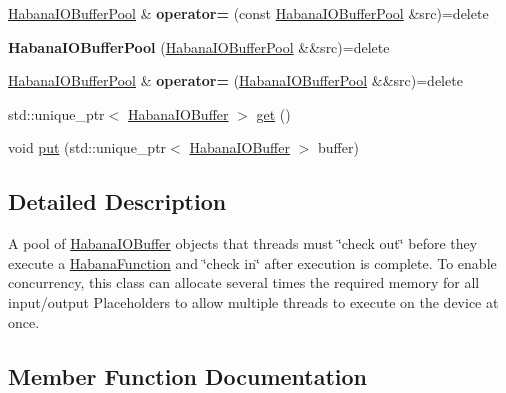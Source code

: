 \begin{DoxyCompactItemize}
\mbox{\label{classglow_1_1_habana_i_o_buffer_pool_aa74083f864afb58c58d45b2aabaea2f5}} 
\hyperlink{classglow_1_1_habana_i_o_buffer_pool}{Habana\+I\+O\+Buffer\+Pool} \& {\bfseries operator=} (const \hyperlink{classglow_1_1_habana_i_o_buffer_pool}{Habana\+I\+O\+Buffer\+Pool} \&src)=delete
\item 
\mbox{\label{classglow_1_1_habana_i_o_buffer_pool_a69283bc0b81a0c55fad0077141238d0c}} 
{\bfseries Habana\+I\+O\+Buffer\+Pool} (\hyperlink{classglow_1_1_habana_i_o_buffer_pool}{Habana\+I\+O\+Buffer\+Pool} \&\&src)=delete
\item 
\mbox{\label{classglow_1_1_habana_i_o_buffer_pool_a4100580e6be1b79f00fff599a9c66d90}} 
\hyperlink{classglow_1_1_habana_i_o_buffer_pool}{Habana\+I\+O\+Buffer\+Pool} \& {\bfseries operator=} (\hyperlink{classglow_1_1_habana_i_o_buffer_pool}{Habana\+I\+O\+Buffer\+Pool} \&\&src)=delete
\item 
std\+::unique\+\_\+ptr$<$ \hyperlink{classglow_1_1_habana_i_o_buffer}{Habana\+I\+O\+Buffer} $>$ \hyperlink{classglow_1_1_habana_i_o_buffer_pool_acd1ce8fdc668b037a9fcfe9cd11c91a2}{get} ()
\item 
void \hyperlink{classglow_1_1_habana_i_o_buffer_pool_a13398e7b08c52427ab3e9838a3d41697}{put} (std\+::unique\+\_\+ptr$<$ \hyperlink{classglow_1_1_habana_i_o_buffer}{Habana\+I\+O\+Buffer} $>$ buffer)
\end{DoxyCompactItemize}


\subsection{Detailed Description}
A pool of \hyperlink{classglow_1_1_habana_i_o_buffer}{Habana\+I\+O\+Buffer} objects that threads must \char`\"{}check
out\char`\"{} before they execute a \hyperlink{classglow_1_1_habana_function}{Habana\+Function} and \char`\"{}check in\char`\"{} after execution is complete. To enable concurrency, this class can allocate several times the required memory for all input/output Placeholders to allow multiple threads to execute on the device at once. 

\subsection{Member Function Documentation}
\mbox{\label{classglow_1_1_habana_i_o_buffer_pool_acd1ce8fdc668b037a9fcfe9cd11c91a2}} 
